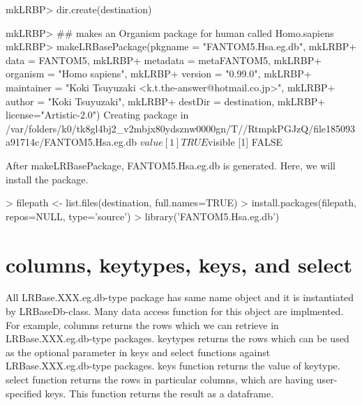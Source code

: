\documentclass[11pt,a4paper,english,arial,twoside]{article}
\begin{document}
\begin{center}
\begin{Schunk}
\begin{Soutput}
mkLRBP> dir.create(destination)

mkLRBP> ## makes an Organism package for human called Homo.sapiens
mkLRBP> makeLRBasePackage(pkgname = "FANTOM5.Hsa.eg.db",
mkLRBP+     data = FANTOM5,
mkLRBP+     metadata = metaFANTOM5,
mkLRBP+     organism = "Homo sapiens",
mkLRBP+     version = "0.99.0",
mkLRBP+     maintainer = "Koki Tsuyuzaki <k.t.the-answer@hotmail.co.jp>",
mkLRBP+     author = "Koki Tsuyuzaki",
mkLRBP+     destDir = destination,
mkLRBP+     license="Artistic-2.0")
Creating package in /var/folders/k0/tk8gl4bj2_v2mbjx80ydsznw0000gn/T//RtmpkPGJzQ/file185093a91714c/FANTOM5.Hsa.eg.db 
$value
[1] TRUE

$visible
[1] FALSE
\end{Soutput}
\end{Schunk}
\end{center}

After makeLRBasePackage, FANTOM5.Hsa.eg.db is generated.
Here, we will install the package.

\begin{center}
\begin{Schunk}
\begin{Sinput}
> filepath <- list.files(destination, full.names=TRUE)
> install.packages(filepath, repos=NULL, type='source')
> library('FANTOM5.Hsa.eg.db')
\end{Sinput}
\end{Schunk}
\end{center}

\section{columns, keytypes, keys, and select}

All LRBase.XXX.eg.db-type package has same name object and it is instantiated by LRBaseDb-class.
Many data access function for this object are implmented. For example, columns returns the rows which we can retrieve in LRBase.XXX.eg.db-type packages. keytypes returns the rows which can be used as the optional parameter in keys and select functions against LRBase.XXX.eg.db-type packages. keys function returns the value of keytype. select function returns the rows in particular columns, which are having user-specified keys. This function returns the result as a dataframe.
\end{document}
